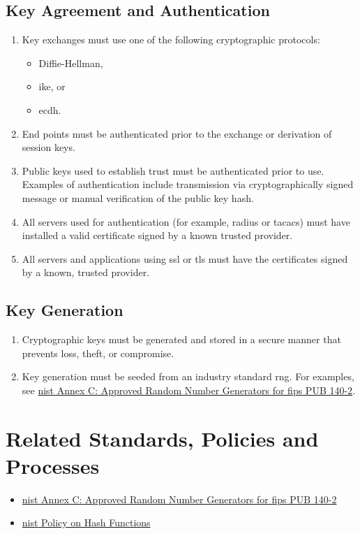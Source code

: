 \subsection{Key Agreement and Authentication}
\begin{enumerate}
\item
Key exchanges must use one of the following cryptographic protocols:
\begin{itemize}
\item{Diffie-Hellman},
\item{\gls{ike}}, or 
\item{\gls{ecdh}}.
\end{itemize}
\item
End points must be authenticated prior to the exchange or derivation of session keys.
\item
Public keys used to establish trust must be authenticated prior to use.  
Examples of authentication include transmission via cryptographically signed message or manual verification of the public key hash.
\item
All servers used for authentication (for example, \gls{radius} or \gls{tacacs}) must have installed a valid certificate signed by a known trusted provider.
\item
All servers and applications using \gls{ssl} or \gls{tls} must have the certificates signed by a known, trusted provider. 
\end{enumerate}

\subsection{Key Generation}
\begin{enumerate}
\item
Cryptographic keys must be generated and stored in a secure manner that prevents loss, theft, or compromise. 
\item
Key generation must be seeded from an industry standard \gls{rng}.  
For examples, see \href{http://csrc.nist.gov/publications/fips/fips140-2/fips1402annexc.pdf}{\acrshort{nist} Annex C: Approved Random Number Generators for \acrshort{fips} PUB 140-2}.  
\end{enumerate}



\CommonPolicyCompliance
\section{Related Standards, Policies and Processes}
\begin{itemize}
\item
\href{http://csrc.nist.gov/publications/fips/fips140-2/fips1402annexc.pdf}{\acrshort{nist} Annex C: Approved Random Number Generators for \acrshort{fips} PUB 140-2}
\item
\href{http://csrc.nist.gov/groups/ST/hash/policy.html}{\acrshort{nist} Policy on Hash Functions}
\end{itemize}



